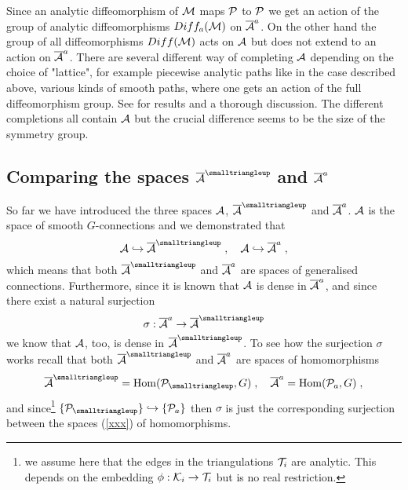 \documentclass[12pt]{article}
\newcommand{\ba}{\begin{eqnarray}}
\newcommand{\ea}{\end{eqnarray}}
\def\s{\sigma}
\def\ca{{\cal A}}
\def\ck{{\cal K}}
\def\cm{{\cal M}}
\def\cp{{\cal P}}
\def\ct{{\cal T}}
\newcommand{\Hom}{\operatorname{Hom}}
\begin{document}
Since an analytic diffeomorphism of $\cm$ maps $\cp$ to $\cp$ we get an action of the group of analytic diffeomorphisms $Diff_a(\cm)$ on $\overline{\ca}^a$. 
On the other hand the group of all diffeomorphisms $Diff (\cm)$ acts on $\ca$ but does not extend to an action on $\overline{\ca}^a$. There are several different way of completing $\ca$ depending on the choice of "lattice", for example piecewise analytic paths like in the case described above, various kinds of  smooth paths, where one gets an action of the full diffeomorphism group. See \cite{Fleischhack:2000ij,Fleischhack:2000am} for results and a thorough discussion. The different completions all contain $\ca$ but the crucial difference seems to be the size of the symmetry group. 
































\subsection{Comparing the spaces $\overline{\ca}^{\smalltriangleup}$ and $\overline{\ca}^{\small a}$}
\label{link}



So far we have introduced the three spaces $\ca$, $\overline{\ca}^{\smalltriangleup}$ and $\overline{\ca}^{\small a}$. $\ca$ is the space of smooth $G$-connections and we demonstrated that
\[
\ca\hookrightarrow \overline{\ca}^{\smalltriangleup}\;,\quad \ca\hookrightarrow \overline{\ca}^{\small a}\;,
\]
which means that both $\overline{\ca}^{\smalltriangleup}$ and $\overline{\ca}^{\small a}$ are spaces of generalised connections. Furthermore, since it is known that $\ca$ is dense in $\overline{\ca}^{\small a}$, and since there exist a natural surjection
\[
\s:\overline{\ca}^{\small a}\rightarrow \overline{\ca}^{\smalltriangleup}
\]
we know that $\ca$, too, is dense in $\overline{\ca}^{\smalltriangleup}$. 
To see how the surjection $\s$ works recall that both $\overline{\ca}^{\smalltriangleup}$ and $\overline{\ca}^{\small a}$ are spaces of homomorphisms
\ba
\overline{\ca}^{\smalltriangleup}=\Hom(\cp_{\smalltriangleup},G)\;,\quad \overline{\ca}^{\small a}=\Hom(\cp_{\small a},G)\;,
\label{xxx}
\ea
and since\footnote{we assume here that the edges in the triangulations $\ct_i$ are analytic. This depends on the embedding $\phi:\ck_i\rightarrow\ct_i$ but is no real restriction.} $\{\cp_{\smalltriangleup}\}\hookrightarrow\{\cp_{\small a}\}$ then $\s$ is just the corresponding surjection between the spaces (\ref{xxx}) of homomorphisms.
\end{document}
